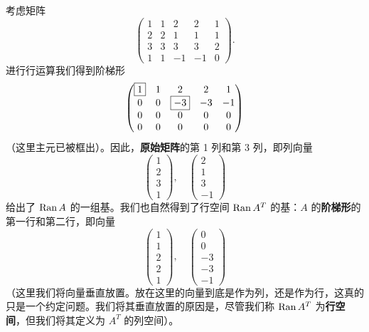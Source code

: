 \begin{example*}
考虑矩阵
$$
\begin{pmatrix}
1 & 1 & 2 & 2 & 1 \\
2 & 2 & 1 & 1 & 1 \\
3 & 3 & 3 & 3 & 2 \\
1 & 1 & -1 & -1 & 0
\end{pmatrix}.
$$
进行行运算我们得到阶梯形
$$
\begin{pmatrix}
\fbox{$1$} & 1 & 2 & 2 & 1 \\
0 & 0 & \fbox{$-3$} & -3 & -1 \\
0 & 0 & 0 & 0 & 0 \\
0 & 0 & 0 & 0 & 0
\end{pmatrix}
$$
（这里主元已被框出）。因此，\textbf{原始矩阵}的第 1 列和第 3 列，即列向量
$$
\begin{pmatrix} 1 \\ 2 \\ 3 \\ 1 \end{pmatrix}, \quad \begin{pmatrix} 2 \\ 1 \\ 3 \\ -1 \end{pmatrix}
$$
给出了 $\operatorname{Ran} A$ 的一组基。我们也自然得到了行空间 $\operatorname{Ran} A^T$ 的基：$A$ 的\textbf{阶梯形}的第一行和第二行，即向量
$$
\begin{pmatrix} 1 \\ 1 \\ 2 \\ 2 \\ 1 \end{pmatrix}, \quad \begin{pmatrix} 0 \\ 0 \\ -3 \\ -3 \\ -1 \end{pmatrix}
$$
（这里我们将向量垂直放置。放在这里的向量到底是作为列，还是作为行，这真的只是一个约定问题。我们将其垂直放置的原因是，尽管我们称 $\operatorname{Ran} A^T$ 为\textbf{行空间}，但我们将其定义为 $A^T$ 的列空间）。
\end{example*}

